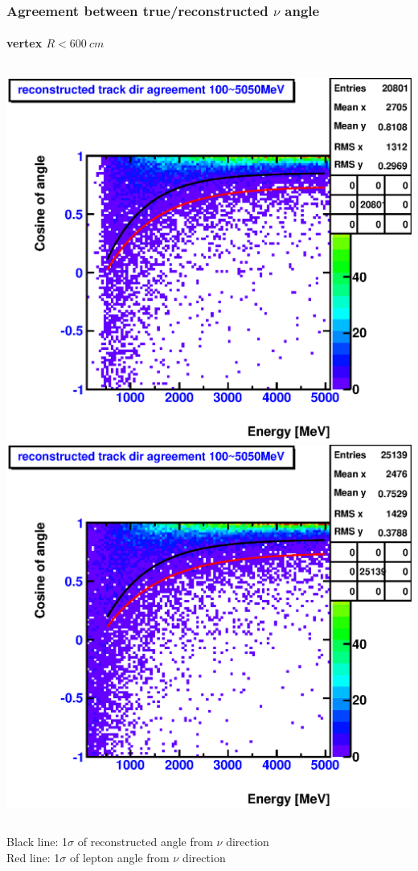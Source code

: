 \documentclass{beamer}
\begin{document}
\begin{frame}
	\frametitle{Agreement between true/reconstructed $\nu$ angle}
	\framesubtitle{vertex $R < \SI{600}{cm}$}
	\begin{columns}[t]
		\includegraphics[width=1.0\textwidth]{analyzed_mtq_flatSpectrum_nue_H1_outerBufferFillAll_reconDirAgreementWithMtqTruthVectorVSEnergy_onlyCC_maxR600cm.eps}
		\includegraphics[width=1.0\textwidth]{analyzed_mtq_flatSpectrum_nue_C12_outerBufferFillAll_reconDirAgreementWithMtqTruthVectorVSEnergy_onlyCC_maxR600cm.eps}
	\end{columns}
	Black line: 1$\sigma$ of reconstructed angle from $\nu$ direction \\
	Red line: 1$\sigma$ of lepton angle from $\nu$ direction
\end{frame}
\end{document}
